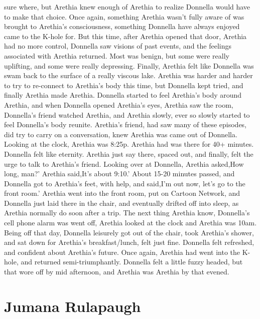 \documentclass[12pt]{book}
\begin{document}
sure where, but Arethia knew enough of Arethia to realize Donnella would have to make that choice. Once again, something Arethia wasn't fully aware of was brought to Arethia's consciousness, something Donnella have always enjoyed came to the K-hole for. But this time, after Arethia opened that door, Arethia had no more control, Donnella saw visions of past events, and the feelings associated with Arethia returned. Most was benign, but some were really uplifting, and some were really depressing. Finally, Arethia felt like Donnella was swam back to the surface of a really viscous lake. Arethia was harder and harder to try to re-connect to Arethia's body this time, but Donnella kept tried, and finally Arethia made Arethia. Donnella started to feel Arethia's body around Arethia, and when Donnella opened Arethia's eyes, Arethia saw the room, Donnella's friend watched Arethia, and Arethia slowly, ever so slowly started to feel Donnella's body reunite. Arethia's friend, had saw many of these episodes, did try to carry on a conversation, knew Arethia was came out of Donnella. Looking at the clock, Arethia was 8:25p. Arethia had was there for 40+ minutes. Donnella felt like eternity. Arethia just say there, spaced out, and finally, felt the urge to talk to Arethia's friend. Looking over at Donnella, Arethia asked,How long, man?' Arethia said,It's about 9:10.' About 15-20 minutes passed, and Donnella got to Arethia's feet, with help, and said,I'm out now, let's go to the front room.' Arethia went into the front room, put on Cartoon Network, and Donnella just laid there in the chair, and eventually drifted off into sleep, as Arethia normally do soon after a trip. The next thing Arethia know, Donnella's cell phone alarm was went off, Arethia looked at the clock and Arethia was 10am. Being off that day, Donnella leisurely got out of the chair, took Arethia's shower, and sat down for Arethia's breakfast/lunch, felt just fine. Donnella felt refreshed, and confident about Arethia's future. Once again, Arethia had went into the K-hole, and returned semi-triumphantly. Donnella felt a little fuzzy headed, but that wore off by mid afternoon, and Arethia was Arethia by that evened.



\chapter{Jumana Rulapaugh}
\end{document}
